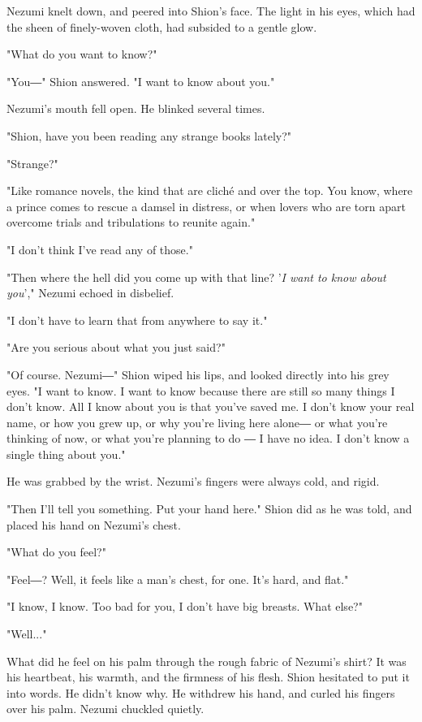 Nezumi knelt down, and peered into Shion's face. The light in his eyes,
which had the sheen of finely-woven cloth, had subsided to a gentle
glow.

"What do you want to know?"

"You―" Shion answered. "I want to know about you."

Nezumi's mouth fell open. He blinked several times.

"Shion, have you been reading any strange books lately?"

"Strange?"

"Like romance novels, the kind that are cliché and over the top. You
know, where a prince comes to rescue a damsel in distress, or when
lovers who are torn apart overcome trials and tribulations to reunite
again."

"I don't think I've read any of those."

"Then where the hell did you come up with that line? '\emph{I want to know
	about you}'," Nezumi echoed in disbelief.

"I don't have to learn that from anywhere to say it."

"Are you serious about what you just said?"

"Of course. Nezumi―" Shion wiped his lips, and looked directly into his
grey eyes. "I want to know. I want to know because there are still so
many things I don't know. All I know about you is that you've saved me.
I don't know your real name, or how you grew up, or why you're living
here alone― or what you're thinking of now, or what you're planning to
do ― I have no idea. I don't know a single thing about you."

He was grabbed by the wrist. Nezumi's fingers were always cold, and
rigid.

"Then I'll tell you something. Put your hand here." Shion did as he was
told, and placed his hand on Nezumi's chest.

"What do you feel?"

"Feel―? Well, it feels like a man's chest, for one. It's hard, and
flat."

"I know, I know. Too bad for you, I don't have big breasts. What else?"

"Well..."

What did he feel on his palm through the rough fabric of Nezumi's shirt?
It was his heartbeat, his warmth, and the firmness of his flesh. Shion
hesitated to put it into words. He didn't know why. He withdrew his
hand, and curled his fingers over his palm. Nezumi chuckled quietly.


